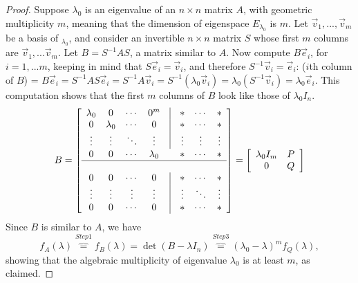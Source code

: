 \documentclass[10pt]{report}
\begin{document}
\begin{proof}
Suppose $\lambda_0$ is an eigenvalue of an $n\times n$ matrix $A$, with geometric multiplicity $m$, meaning that the dimension of eigenspace $E_{\lambda_0}$ is $m$. Let $\vec{v}_1,..., \vec{v}_m$ be a basis of $_{\lambda_0}$, and consider an invertible $n\times n$ matrix $S$ whose first $m$ columns are $\vec{v}_1,...\vec{v}_m$. Let $B=S^{-1}AS$, a matrix similar to $A$. Now compute $B\vec{e}_i$, for $i=1,...m$, keeping in mind that $S\vec{e}_i=\vec{v}_i$, and therefore $S^{-1}\vec{v}_i = \vec{e}_i$: ($i$th column of $B$) = $B\vec{e}_i = S^{-1}AS\vec{e}_i = S^{-1}A\vec{v}_i = S^{-1}(\lambda_0 \vec{v}_i) = \lambda_0(S^{-1}\vec{v}_i) = \lambda_0 \vec{e}_i$. This computation shows that the first $m$ columns of $B$ look like those of $\lambda_0 I_n$.
$$B = \left[\begin{array}{c c c c c c c c}
\lambda_0 & 0 & \cdots & 0^m & \vline & * & \cdots & *\\
0 & \lambda_0 & \cdots & 0 & \vline & * & \cdots & *\\
\vdots & \vdots & \ddots & \vdots & \vline & \vdots & \vdots & \vdots\\
0 & 0 & \cdots & \lambda_0 &  & * & \cdots & *\\
\hline\\
0 & 0 & \cdots & 0 & \vline & * & \cdots & *\\
\vdots & \vdots & \vdots & \vdots & \vline & \vdots & \ddots & \vdots\\
0 & 0 & \cdots & 0 & \vline & * & \cdots & *
\end{array}\right] = \left[\begin{array}{c c}
\lambda_0I_m & P\\
0 & Q
\end{array}\right]$$
Since $B$ is similar to $A$, we have
$$f_A(\lambda) \overbrace{=}^{Step 1} f_B(\lambda) = \det(B-\lambda I_n) \overbrace{=}^{Step 3} (\lambda_0-\lambda)^mf_Q(\lambda),$$
showing that the algebraic multiplicity of eigenvalue $\lambda_0$ is at least $m$, as claimed.
\end{proof}
\end{document}
